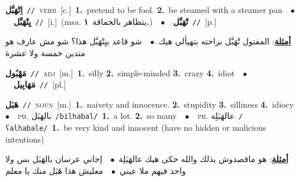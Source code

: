 \documentclass[10pt,a4paper,twoside]{article} %
\begin{document}
\begin{multicols}{2}
{{{{{{{\setlength\topsep{0pt}\textbf{\foreignlanguage{arabic}{اِتْهَبَّل}}\ {\color{gray}\texttt{//}\color{black}}\ \textsc{verb}\ [c.]\ \textbf{1.}~pretend to be fool.  \textbf{2.}~be steamed with a steamer pan\ \ $\bullet$\ \ \setlength\topsep{0pt}\textbf{\foreignlanguage{arabic}{يِتْهَبَّل}}\ {\color{gray}\texttt{//}\color{black}}\ [i.]\ \color{gray}(msa. \foreignlanguage{arabic}{يتظاهر بالحماقة}~\foreignlanguage{arabic}{\textbf{١.}})\color{black}\ \ $\bullet$\ \ \setlength\topsep{0pt}\textbf{\foreignlanguage{arabic}{تْهَبَّل}}\ {\color{gray}\texttt{//}\color{black}}\ [p.]\  \begin{flushright}\color{gray}\foreignlanguage{arabic}{\textbf{\underline{\foreignlanguage{arabic}{أمثلة}}}: المفتول تْهَبَّل براحته بتهيألي هيك\ $\bullet$\ \  شو قاعد بيِتْهَبَّل هذا؟ شو مش عارف هو متدين خمسة ولا عشرة}\end{flushright}\color{black}} \vspace{2mm}

{\setlength\topsep{0pt}\textbf{\foreignlanguage{arabic}{مَهْبُول}}\ {\color{gray}\texttt{//}\color{black}}\ \textsc{adj}\ [m.]\ \textbf{1.}~silly  \textbf{2.}~simple-minded  \textbf{3.}~crazy  \textbf{4.}~idiot\ \ $\bullet$\ \ \setlength\topsep{0pt}\textbf{\foreignlanguage{arabic}{مَهَابِيل}}\ {\color{gray}\texttt{//}\color{black}}\ [pl.]\ 

{\setlength\topsep{0pt}\textbf{\foreignlanguage{arabic}{هَبَل}}\ {\color{gray}\texttt{//}\color{black}}\ \textsc{noun}\ [m.]\ \textbf{1.}~naivety and innocence.  \textbf{2.}~stupidity  \textbf{3.}~silliness  \textbf{4.}~idiocy\ \ $\bullet$\ \ \textsc{ph.} \color{gray} \foreignlanguage{arabic}{بالهَبَل}\color{black}\ {\color{gray}\texttt{/{\sffamily bilhabal}/}\color{black}}\ \textbf{1.}~a lot.  \textbf{2.}~so many\ \ $\bullet$\ \ \textsc{ph.} \color{gray} \foreignlanguage{arabic}{عالهَبَلِة}\color{black}\ {\color{gray}\texttt{/{\sffamily ʕalhabale}/}\color{black}}\ \textbf{1.}~be very kind and innocent (have no hidden or malicious intentions)\  \begin{flushright}\color{gray}\foreignlanguage{arabic}{\textbf{\underline{\foreignlanguage{arabic}{أمثلة}}}: هو ماقصدوش يذلك والله حكى هيك عالهَبَلِة\ $\bullet$\ \  إجاني عرسان بالهَبَل بس ولا واحد فيهم ملا عيني\ $\bullet$\ \  معليش هذا هَبَل منك يا معلم}\end{flushright}\color{black}} \vspace{2mm}

}}}}}}}
\end{multicols}
\end{document}
